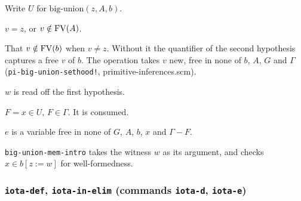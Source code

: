 Write $U$ for $\mathrm{big\text{-}union}(z, A, b)$.
\label{kop:big-union-sethood}%
\begin{VNBcond}
\item[Freshness] $v = z$, or $v \notin \mathrm{FV}(A)$.
\item[Not checked] That $v \notin \mathrm{FV}(b)$ when $v \neq z$.  Without it
  the quantifier of the second hypothesis captures a free $v$ of $b$.
  The operation takes $v$ new, free in none of $b$, $A$, $G$ and
  $\Gamma$ (\texttt{pi-big-union-sethood!}, primitive-inferences.scm).
\end{VNBcond}
\label{kop:big-union-mem-intro}%
\begin{VNBcond}
\item[Matching] $w$ is read off the first hypothesis.
\end{VNBcond}
\label{kop:big-union-mem-elim}%
\begin{VNBcond}
\item[Assumption] $F = x \in U$, $F \in \Gamma$.  It is consumed.
\item[Eigenvariable] $e$ is a variable free in none of $G$, $A$, $b$,
  $x$ and $\Gamma - F$.
\end{VNBcond}
\texttt{big-union-mem-intro} takes the witness $w$ as its argument, and
checks $x \in b[z{:=}w]$ for well-formedness.

\subsubsection*{\texttt{iota-def}, \texttt{iota-in-elim}
  (commands \texttt{iota-d}, \texttt{iota-e})}

